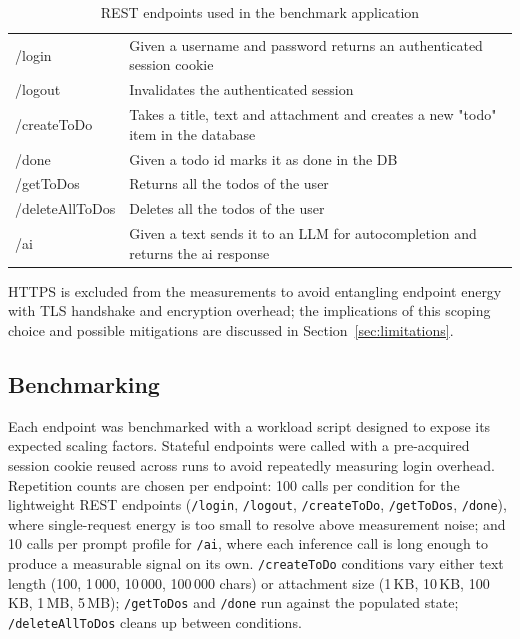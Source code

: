 \documentclass[sigconf]{acmart}
\begin{document}
\begin{table}
    \centering
    \begin{tabular}{p{1.7cm} p{6.3cm}}
        /login & Given a username and password returns an authenticated session cookie \\
        /logout & Invalidates the authenticated session \\
        /createToDo  & Takes a title, text and attachment and creates a new "todo" item in the database \\
        /done &  Given a todo id marks it as done in the DB \\
        /getToDos  & Returns all the todos of the user \\
        /deleteAllToDos & Deletes all the todos of the user \\
        /ai & Given a text sends it to an LLM for autocompletion and returns the ai response \\
    \end{tabular}
    \caption{REST endpoints used in the benchmark application}
    \label{tab:endpoints}
\end{table}

HTTPS is excluded from the measurements to avoid entangling endpoint energy with TLS handshake and encryption overhead; the implications of this scoping choice and possible mitigations are discussed in Section~\ref{sec:limitations}.


\subsection{Benchmarking}
Each endpoint was benchmarked with a workload script designed to expose its expected scaling factors. Stateful endpoints were called with a pre-acquired session cookie reused across runs to avoid repeatedly measuring login overhead. Repetition counts are chosen per endpoint: 100 calls per condition for the lightweight REST endpoints (\texttt{/login}, \texttt{/logout}, \texttt{/createToDo}, \texttt{/getToDos}, \texttt{/done}), where single-request energy is too small to resolve above measurement noise; and 10 calls per prompt profile for \texttt{/ai}, where each inference call is long enough to produce a measurable signal on its own. \texttt{/createToDo} conditions vary either text length (100, 1\,000, 10\,000, 100\,000 chars) or attachment size (1\,KB, 10\,KB, 100\,KB, 1\,MB, 5\,MB); \texttt{/getToDos} and \texttt{/done} run against the populated state; \texttt{/deleteAllToDos} cleans up between conditions.
\end{document}

